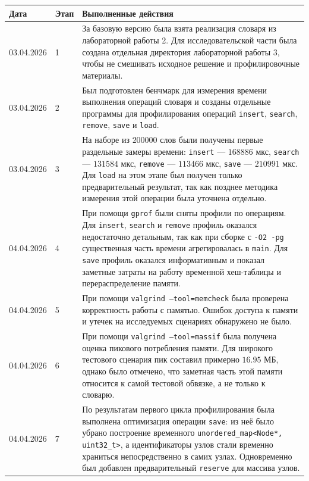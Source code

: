 \begin{longtable}{|p{}|p{}|p{}|}
\toprule
Дата & Этап & Выполненные действия \\
\midrule
03.04.2026 & 1 &
За базовую версию была взята реализация словаря из лабораторной работы 2. Для исследовательской части была создана отдельная директория лабораторной работы 3, чтобы не смешивать исходное решение и профилировочные материалы. \\
\hline

03.04.2026 & 2 &
Был подготовлен бенчмарк для измерения времени выполнения операций словаря и созданы отдельные программы для профилирования операций \texttt{insert}, \texttt{search}, \texttt{remove}, \texttt{save} и \texttt{load}. \\
\hline

03.04.2026 & 3 &
На наборе из \(200000\) слов были получены первые раздельные замеры времени: \texttt{insert} --- \(168886\) мкс, \texttt{search} --- \(131584\) мкс, \texttt{remove} --- \(113466\) мкс, \texttt{save} --- \(210991\) мкс. Для \texttt{load} на этом этапе был получен только предварительный результат, так как позднее методика измерения этой операции была уточнена отдельно. \\
\hline

04.04.2026 & 4 &
При помощи \texttt{gprof} были сняты профили по операциям. Для \texttt{insert}, \texttt{search} и \texttt{remove} профиль оказался недостаточно детальным, так как при сборке с \texttt{-O2 -pg} существенная часть времени агрегировалась в \texttt{main}. Для \texttt{save} профиль оказался информативным и показал заметные затраты на работу временной хеш-таблицы и перераспределение памяти. \\
\hline

04.04.2026 & 5 &
При помощи \texttt{valgrind --tool=memcheck} была проверена корректность работы с памятью. Ошибок доступа к памяти и утечек на исследуемых сценариях обнаружено не было. \\
\hline

04.04.2026 & 6 &
При помощи \texttt{valgrind --tool=massif} была получена оценка пикового потребления памяти. Для широкого тестового сценария пик составил примерно \(16.95\) МБ, однако было отмечено, что заметная часть этой памяти относится к самой тестовой обвязке, а не только к словарю. \\
\hline

04.04.2026 & 7 &
По результатам первого цикла профилирования была выполнена оптимизация операции \texttt{save}: из неё было убрано построение временного \texttt{unordered\_map<Node*, uint32\_t>}, а идентификаторы узлов стали временно храниться непосредственно в самих узлах. Одновременно был добавлен предварительный \texttt{reserve} для массива узлов. \\
\hline


\end{longtable}
